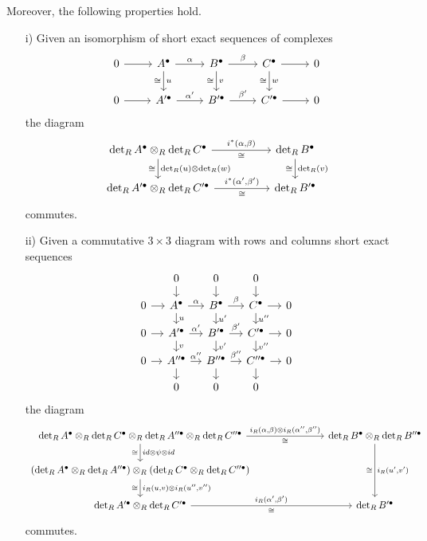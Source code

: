 \documentclass{article}
\numberwithin{equation}{section}
\begin{document}
\begin{appendices}
\begin{theorem}
  Moreover, the following properties hold.

  \begin{enumerate}
  \item[i)] Given an isomorphism of short exact sequences of complexes
    \[ \begin{tikzcd}
        0 \ar{r} & A^\bullet \ar{r}{\alpha}\ar{d}{u}[swap]{\cong} & B^\bullet \ar{r}{\beta}\ar{d}{v}[swap]{\cong} & C^\bullet \ar{r}\ar{d}{w}[swap]{\cong} & 0 \\
        0 \ar{r} & A'^\bullet \ar{r}{\alpha'} & B'^\bullet \ar{r}{\beta'} & C'^\bullet \ar{r} & 0
      \end{tikzcd} \]
    the diagram
    \[ \begin{tikzcd}[column sep=5em]
        \det_R A^\bullet \otimes_R \det_R C^\bullet \ar{r}{i^* (\alpha,\beta)}[swap]{\cong}\ar{d}{\det_R (u) \otimes \det_R (w)}[swap]{\cong} & \det_R B^\bullet\ar{d}{\det_R (v)}[swap]{\cong} \\
        \det_R A'^\bullet \otimes_R \det_R C'^\bullet \ar{r}{i^* (\alpha',\beta')}[swap]{\cong} & \det_R B'^\bullet
      \end{tikzcd} \]
    commutes.

  \item[ii)] Given a commutative $3\times 3$ diagram with rows and columns short
    exact sequences
    \[ \begin{tikzcd}[row sep=1em, column sep=1em]
        & 0\ar{d} & 0\ar{d} & 0\ar{d} \\
        0\ar{r} & A^\bullet\ar{r}{\alpha}\ar{d}{u} & B^\bullet\ar{r}{\beta}\ar{d}{u'} & C^\bullet\ar{r}\ar{d}{u''} & 0 \\
        0\ar{r} & A'^\bullet\ar{r}{\alpha'}\ar{d}{v} & B'^\bullet\ar{r}{\beta'}\ar{d}{v'} & C'^\bullet\ar{r}\ar{d}{v''} & 0 \\
        0\ar{r} & A''^\bullet\ar{r}{\alpha''}\ar{d} & B''^\bullet\ar{r}{\beta''}\ar{d} & C''^\bullet\ar{r}\ar{d} & 0 \\
        & 0 & 0 & 0
      \end{tikzcd} \]
    the diagram
    \[ \begin{tikzcd}[column sep=7em]
        \det_R A^\bullet \otimes_R \det_R C^\bullet \otimes_R \det_R A''^\bullet \otimes_R \det_R C''^\bullet \ar{r}{i_R (\alpha,\beta) \otimes i_R (\alpha'',\beta'')}[swap]{\cong}\ar{d}{id \otimes \psi \otimes id}[swap]{\cong} & \det_R B^\bullet \otimes_R \det_R B''^\bullet\ar{dd}{i_R (u',v')}[swap]{\cong} \\
        (\det_R A^\bullet \otimes_R \det_R A''^\bullet) \otimes_R (\det_R C^\bullet \otimes_R \det_R C''^\bullet)\ar{d}[swap]{\cong}{i_R (u,v) \otimes i_R (u'',v'')} \\
        \det_R A'^\bullet \otimes_R \det_R C'^\bullet \ar{r}{i_R (\alpha',\beta')}[swap]{\cong} & \det_R B'^\bullet
      \end{tikzcd} \]
    commutes.


\end{enumerate}
\end{theorem}
\end{appendices}
\end{document}
